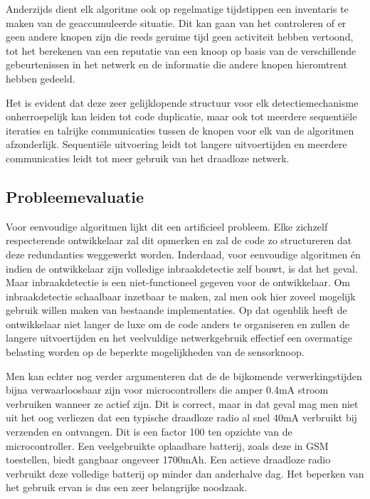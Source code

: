 \documentclass[12pt,a4paper,draft]{article}
\begin{document}
Anderzijds dient elk algoritme ook op regelmatige tijdstippen een inventaris te
maken van de geaccumuleerde situatie. Dit kan gaan van het controleren of er
geen andere knopen zijn die reeds geruime tijd geen activiteit hebben vertoond,
tot het berekenen van een reputatie van een knoop op basis van de verschillende
gebeurtenissen in het netwerk en de informatie die andere knopen hieromtrent
hebben gedeeld.

Het is evident dat deze zeer gelijklopende structuur voor elk
detectiemechanisme onherroepelijk kan leiden tot code duplicatie, maar ook tot
meerdere sequenti\"ele iteraties en talrijke communicaties tussen de knopen
voor elk van de algoritmen afzonderlijk. Sequenti\"ele uitvoering leidt tot
langere uitvoertijden en meerdere communicaties leidt tot meer gebruik van het
draadloze netwerk.

\subsection*{Probleemevaluatie}

Voor eenvoudige algoritmen lijkt dit een artificieel probleem. Elke zichzelf
respecterende ontwikkelaar zal dit opmerken en zal de code zo structureren dat
deze redundanties weggewerkt worden. Inderdaad, voor eenvoudige algoritmen \'en
indien de ontwikkelaar zijn volledige inbraakdetectie zelf bouwt, is dat het
geval. Maar inbraakdetectie is een niet-functioneel gegeven voor de
ontwikkelaar. Om inbraakdetectie schaalbaar inzetbaar te maken, zal men ook
hier zoveel mogelijk gebruik willen maken van bestaande implementaties. Op dat
ogenblik heeft de ontwikkelaar niet langer de luxe om de code anders te
organiseren en zullen de langere uitvoertijden en het veelvuldige
netwerkgebruik effectief een overmatige belasting worden op de beperkte
mogelijkheden van de sensorknoop.

Men kan echter nog verder argumenteren dat de de bijkomende verwerkingstijden
bijna verwaarloosbaar zijn voor microcontrollers die amper 0.4mA stroom
verbruiken wanneer ze actief zijn. Dit is correct, maar in dat geval mag men
niet uit het oog verliezen dat een typische draadloze radio al snel 40mA
verbruikt bij verzenden en ontvangen. Dit is een factor 100 ten opzichte van de
microcontroller. Een veelgebruikte oplaadbare batterij, zoals deze in GSM
toestellen, biedt gangbaar ongeveer 1700mAh. Een actieve draadloze radio
verbruikt deze volledige batterij op minder dan anderhalve dag. Het beperken
van het gebruik ervan is dus een zeer belangrijke noodzaak.
\end{document}
